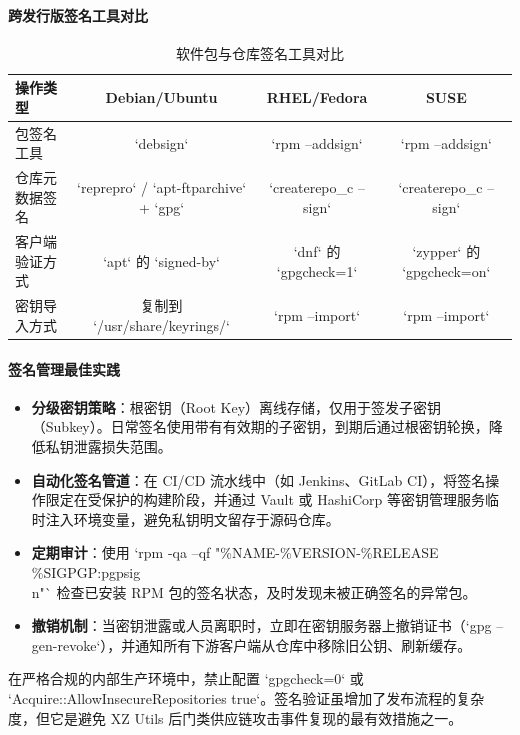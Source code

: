 \documentclass[12pt,UTF8]{ctexbook}
\begin{document}
\paragraph{跨发行版签名工具对比}
\begin{table}[htbp]
	\centering
	\caption{软件包与仓库签名工具对比}
	\begin{tabular}{@{}lccc@{}}
		\toprule
		\textbf{操作类型} & \textbf{Debian/Ubuntu} & \textbf{RHEL/Fedora} & \textbf{SUSE} \\
		\midrule
		包签名工具 & `debsign` & `rpm --addsign` & `rpm --addsign` \\
		仓库元数据签名 & `reprepro` / `apt-ftparchive` + `gpg` & `createrepo\_c --sign` & `createrepo\_c --sign` \\
		客户端验证方式 & `apt` 的 `signed-by` & `dnf` 的 `gpgcheck=1` & `zypper` 的 `gpgcheck=on` \\
		密钥导入方式 & 复制到 `/usr/share/keyrings/` & `rpm --import` & `rpm --import` \\
		\bottomrule
	\end{tabular}
\end{table}

\paragraph{签名管理最佳实践}
\begin{itemize}
	\item \textbf{分级密钥策略}：根密钥（Root Key）离线存储，仅用于签发子密钥（Subkey）。日常签名使用带有有效期的子密钥，到期后通过根密钥轮换，降低私钥泄露损失范围。
	\item \textbf{自动化签名管道}：在 CI/CD 流水线中（如 Jenkins、GitLab CI），将签名操作限定在受保护的构建阶段，并通过 Vault 或 HashiCorp 等密钥管理服务临时注入环境变量，避免私钥明文留存于源码仓库。
	\item \textbf{定期审计}：使用 `rpm -qa --qf "\%{NAME}-\%{VERSION}-\%{RELEASE} \%{SIGPGP:pgpsig}\\n"` 检查已安装 RPM 包的签名状态，及时发现未被正确签名的异常包。
	\item \textbf{撤销机制}：当密钥泄露或人员离职时，立即在密钥服务器上撤销证书（`gpg --gen-revoke`），并通知所有下游客户端从仓库中移除旧公钥、刷新缓存。
\end{itemize}

在严格合规的内部生产环境中，禁止配置 `gpgcheck=0` 或 `Acquire::AllowInsecureRepositories true`。签名验证虽增加了发布流程的复杂度，但它是避免 XZ Utils 后门类供应链攻击事件复现的最有效措施之一。
\end{document}
